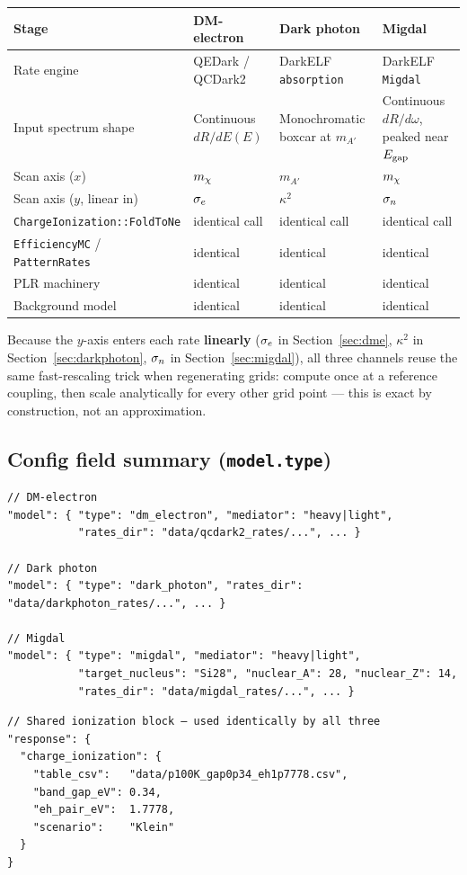 \begin{center}
\begin{tabular}{@{}p{3.2cm}p{3.5cm}p{3.5cm}p{3.5cm}@{}}
\toprule
Stage & DM-electron & Dark photon & Migdal \\
\midrule
Rate engine & QEDark / QCDark2 & DarkELF \texttt{absorption} & DarkELF \texttt{Migdal} \\
Input spectrum shape & Continuous $dR/dE(E)$ & Monochromatic boxcar at $m_{A'}$ & Continuous $dR/d\omega$, peaked near $E_\mathrm{gap}$ \\
Scan axis ($x$) & $m_\chi$ & $m_{A'}$ & $m_\chi$ \\
Scan axis ($y$, linear in) & $\sigma_e$ & $\kappa^2$ & $\sigma_n$ \\
\texttt{ChargeIonization::FoldToNe} & identical call & identical call & identical call \\
\texttt{EfficiencyMC} / \texttt{PatternRates} & identical & identical & identical \\
PLR machinery & identical & identical & identical \\
Background model & identical & identical & identical \\
\bottomrule
\end{tabular}
\end{center}

Because the $y$-axis enters each rate \textbf{linearly} ($\sigma_e$ in
Section~\ref{sec:dme}, $\kappa^2$ in Section~\ref{sec:darkphoton},
$\sigma_n$ in Section~\ref{sec:migdal}), all three channels reuse the same
fast-rescaling trick when regenerating grids: compute once at a reference
coupling, then scale analytically for every other grid point — this is
exact by construction, not an approximation.

\subsection{Config field summary (\texttt{model.type})}

\begin{verbatim}
// DM-electron
"model": { "type": "dm_electron", "mediator": "heavy|light",
           "rates_dir": "data/qcdark2_rates/...", ... }

// Dark photon
"model": { "type": "dark_photon", "rates_dir": "data/darkphoton_rates/...", ... }

// Migdal
"model": { "type": "migdal", "mediator": "heavy|light",
           "target_nucleus": "Si28", "nuclear_A": 28, "nuclear_Z": 14,
           "rates_dir": "data/migdal_rates/...", ... }
\end{verbatim}

\begin{verbatim}
// Shared ionization block — used identically by all three
"response": {
  "charge_ionization": {
    "table_csv":   "data/p100K_gap0p34_eh1p7778.csv",
    "band_gap_eV": 0.34,
    "eh_pair_eV":  1.7778,
    "scenario":    "Klein"
  }
}
\end{verbatim}
